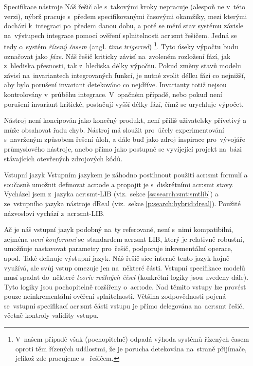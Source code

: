 \documentclass[thesis=M,czech]{FITthesis}[2012/06/26]
\newcommand{\acrlabel}[1]{acr:#1}
\newcommand{\acr}[1]{\acrshort{\acrlabel{#1}}}
\newcommand{\hl}[1]{\textit{#1}}
\newcommand{\name}[1]{\hl{#1}}
\newcommand{\rf}[1]{\ref{#1}}
\begin{document}
\begin{section}{Specifikace nástroje}
Náš řešič ale s~takovými kroky nepracuje
(alespoň ne v~této verzi),
nýbrž pracuje s~předem specifikovanými časovými okamžiky,
mezi kterými dochází k~integraci po~předem danou dobu,
a poté se mění stav systému závisle na~výstupech integrace
pomocí ověření splnitelnosti \acr{smt} řešičem.
Jedná se tedy o~systém \name{řízený časem}
(angl. \name{time trigerred})%
\footnote{V~našem případě však (pochopitelně) odpadá
výhoda systémů řízených časem oproti těm řízených událostmi,
že je porucha detekována na~straně přijímače,
jelikož zde pracujeme s~ řešičem.}.
Tyto úseky výpočtu budu označovat jako \name{fáze}.
Náš řešič kriticky závisí na~zvoleném rozložení fází,
jak z~hlediska přesnosti, tak z~hlediska délky výpočtu.
Pokud změny stavů modelu závisí na~invariantech
integrovaných funkcí,
je nutné zvolit délku fází co nejnižší,
aby bylo porušení invariant detekováno co nejdříve.
Invarianty totiž nejsou kontrolovány v~průběhu integrace.
V~opačném případě, nebo pokud není porušení invariant kritické,
postačují vyšší délky fází,
čímž se urychluje výpočet.

Nástroj není koncipován jako konečný produkt,
není příliš uživatelsky přívetivý
a může obsahovat řadu chyb.
Nástroj má sloužit pro~účely experimentování
s~navrženým způsobem řešení úloh,
a dále buď jako zdroj inspirace
pro~vývojáře průmyslového nástroje,
anebo přímo jako postupně se vyvíjející projekt
na~bázi stávajících otevřených zdrojových kódů.


\begin{subsection}{Vstupní jazyk}\label{ss:design:spec:ilang}
Vstupním jazykem je záhodno postihnout
použití \acr{smt} formulí
a současně umožnit definovat \acr{ode}
a propojit je s~diskrétními \acr{smt} stavy.
Vycházel jsem z~jazyka \acr{smt}-LIB
(viz.~sekce \rf{ss:search:smt:smtlib})
a ze~vstupního jazyka nástroje dReal
(viz.~sekce \rf{p:search:hybrid:dreal}).
Použité názvosloví vychází z~\acr{smt}-LIB.

Ač je náš vstupní jazyk podobný na~ty referované,
není s~nimi kompatibilní,
zejména \hl{není konformní} se~standardem \acr{smt}-LIB,
který je relativně robustní,
umožňuje nastavovat parametry pro~řešič,
podporuje inkrementální operace, apod.
Také definuje výstupní jazyk.
Náš řešič sice interně tento jazyk hojně využívá,
ale svůj vstup omezuje jen na~některé části.
Vstupní specifikace modelů musí
spadat do~některé \hl{teorie reálných čísel}
(konkrétní logiky jsou uvedeny dále).
Tyto logiky jsou pochopitelně rozšířeny o~\acr{ode}.
Nad těmito vstupy lze provést pouze neinkrementální ověření splnitelnosti.
Většina zodpovědnosti pojená se~vstupní specifikací
\acr{smt} části vstupu je přímo delegována
na~\acr{smt} řešič, včetně kontroly validity vstupu.


\end{subsection}
\end{section}
\end{document}

